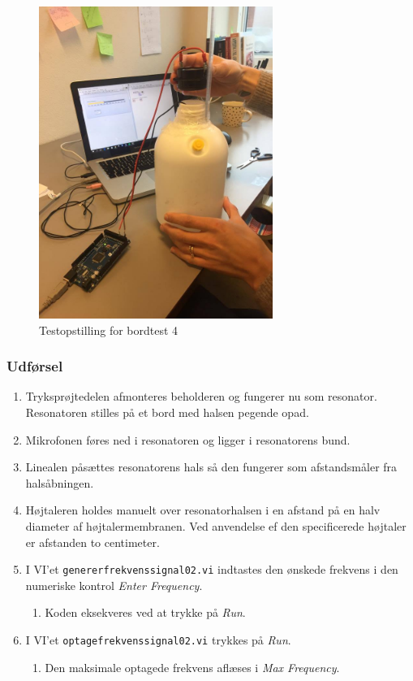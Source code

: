 		\begin{figure}[htb]
			\centering
				\includegraphics[width=3in]{bordtest4}
				\caption{Testopstilling for bordtest 4}	
				\label{fig:bt4}
			\end{figure}
		

		
		\subsubsection{Udførsel}
			
			\begin{enumerate}
				\item Tryksprøjtedelen afmonteres beholderen og fungerer nu som resonator. Resonatoren stilles på et bord med halsen pegende opad. 
				\item Mikrofonen føres ned i resonatoren og ligger i resonatorens bund. 
				\item Linealen påsættes resonatorens hals så den fungerer som afstandsmåler fra halsåbningen.
				\item Højtaleren holdes manuelt over resonatorhalsen i en afstand på en halv diameter af højtalermembranen. Ved anvendelse ef den specificerede højtaler er afstanden to centimeter. 
				\item I VI'et \texttt{genererfrekvenssignal02.vi} indtastes den ønskede frekvens i den numeriske kontrol \textit{Enter Frequency}. 
					\begin{enumerate}
						\item Koden eksekveres ved at trykke på \textit{Run}. 
					\end{enumerate} 
				\item I VI'et \texttt{optagefrekvenssignal02.vi} trykkes på \textit{Run}. 
					\begin{enumerate}
						\item Den maksimale optagede frekvens aflæses i \textit{Max Frequency}. 
					\end{enumerate}	 	
			\end{enumerate}
			
